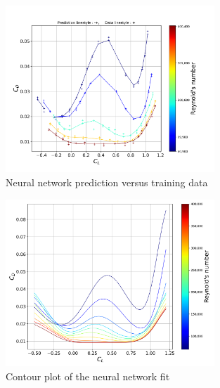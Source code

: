 \documentclass[letterpaper,12pt]{article}
\begin{document}
\begin{enumerate}
\begin{figure}[H]
    \centering
    \includegraphics[width=0.7\textwidth]{nn_pred}
    \vspace{-1cm}
    \caption{Neural network prediction versus training data}%
    \label{fig:nn_pred}%
\end{figure}

\begin{figure}[H]
    \centering
    \includegraphics[width=0.7\textwidth]{nn}
    \vspace{-0.7cm}
    \caption{Contour plot of the neural network fit}%
    \label{fig:nn}%
\end{figure}

\end{enumerate}
\end{document}
